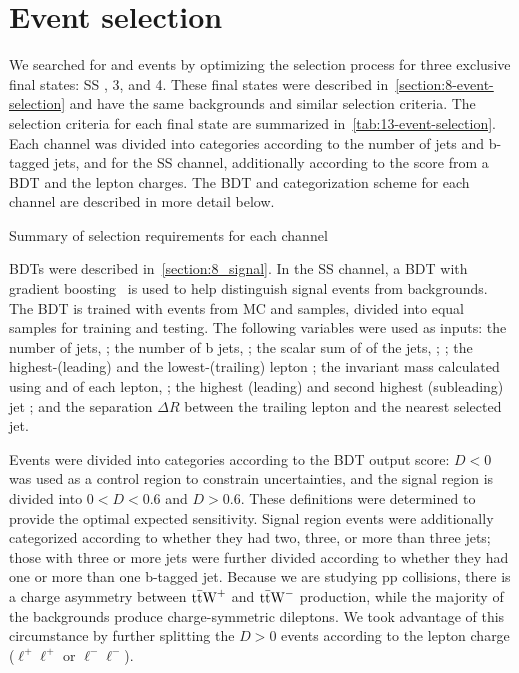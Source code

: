 \begin{table}
  \centering
  
\end{table}

\section{Event selection}
\label{section:13_event_selection}
We searched for \ttW and \ttZ events by optimizing the selection process for three exclusive final
states: SS \ttW, 3\lep \ttZ, and 4\lep \ttZ. These final states were described
in~\cref{section:8-event-selection} and have the same backgrounds and similar selection criteria.
The selection criteria for each final state are summarized in~\cref{tab:13-event-selection}. Each
channel was divided into categories according to the number of jets and b-tagged jets, and for the
SS \ttW channel, additionally according to the score from a BDT and the lepton charges. The \ttW BDT
and categorization scheme for each channel are described in more detail below.

\begin{table}
  \centering
  \caption{Summary of selection requirements for each channel}
  \label{tab:13-event-selection}
  
\end{table}

BDTs were described in~\cref{section:8_signal}. In the SS \ttW channel, a BDT with gradient
boosting~\cite{bdt_nim} is used to help distinguish signal \ttW events from backgrounds. The BDT is
trained with events from MC \ttW and \ttbar samples, divided into equal samples for training and
testing. The following variables were used as inputs: the number of jets, \njets; the number of b
jets, \nbjets; the scalar sum of \pT of the jets, \HT; \pTmiss; the highest-\pT (leading) and the
lowest-\pT (trailing) lepton \pT; the invariant mass calculated using \pTmiss and \pT of each
lepton, \MT; the highest (leading) and second highest (subleading) jet \pT; and the separation
$\Delta R$ between the trailing lepton and the nearest selected jet.

Events were divided into categories according to the BDT output score: $D < 0$ was used as a control
region to constrain uncertainties, and the signal region is divided into $0 < D < 0.6$ and $D >
0.6$. These definitions were determined to provide the optimal expected sensitivity. Signal region
events were additionally categorized according to whether they had two, three, or more than three
jets; those with three or more jets were further divided according to whether they had one or more
than one b-tagged jet. Because we are studying pp collisions, there is a charge asymmetry between
$\text{t}\bar{\text{t}}\text{W}^+$ and $\text{t}\bar{\text{t}}\text{W}^-$ production, while the majority of the backgrounds produce charge-symmetric
dileptons. We took advantage of this circumstance by further splitting the $D>0$ events according to
the lepton charge ($\ell^+\ell^+$ or $\ell^-\ell^-$).

